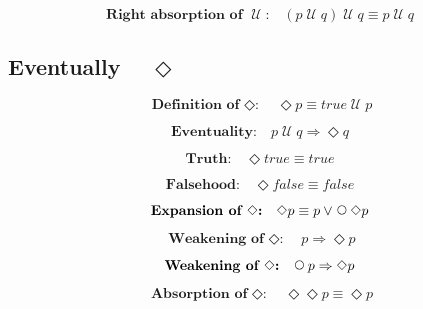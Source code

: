 \documentclass[fleqn, leqno]{article}
\newcommand{\impl}{\ensuremath{\Rightarrow}}        %
\newcommand{\Until}{\;\mathcal{U}\;}
\newcommand{\Next}{\;\,\text{\raisebox{3.5pt}{\circle{6}}}}
\newcommand{\Event}{\Diamond}
\newcommand{\spacer}{\vspace{-30pt}}
\newcommand{\firstspacer}{\vspace{-26pt}}
\begin{document}
\spacer

\begin{equation}\label{E:untilIdemR}
\textbf{Right absorption of $\Until$:}\quad (p \Until q) \Until q \equiv p \Until q
\end{equation}

\newpage

\subsection*{Eventually $\quad\Event$}

\begin{equation}\label{E:defEvent}
\textbf{Definition of $\Event$:}\quad \Event p \equiv true \Until p
\end{equation}

\firstspacer

\begin{equation}\label{E:eventuality}
\textbf{Eventuality:}\quad p \Until q \impl \Event q
\end{equation}

\spacer

\begin{equation}\label{E:eventTrue}
\textbf{Truth:}\quad \Event true \equiv true
\end{equation}

\spacer

\begin{equation}\label{E:eventFalse}
\textbf{Falsehood:}\quad \Event false \equiv false
\end{equation}

\spacer

\begin{equation}\label{E:expansionEvent}
\textbf{Expansion of $\Event$:}\quad \Event p \equiv p \lor \Next\Event p
\end{equation}

\spacer

\begin{equation}\label{E:impEvent}
\textbf{Weakening of $\Event$:}\quad p \impl \Event p
\end{equation}

\spacer

\begin{equation}\label{E:nextEvent}
\textbf{Weakening of $\Event$:}\quad \Next p \impl \Event p
\end{equation}

\spacer

\begin{equation}\label{E:IdemEvent}
\textbf{Absorption of $\Event$:}\quad \Event\Event p \equiv \Event p
\end{equation}
\end{document}

